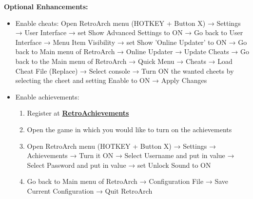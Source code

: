 \begin{enumerate}
\noindent \textbf{Optional Enhancements:}
\begin{itemize}

\item Enable cheats: Open RetroArch menu (HOTKEY + Button X) → Settings → User Interface → set Show Advanced Settings to ON → Go back to User Interface → Menu Item Visibility → set Show 'Online Updater' to ON → Go back to Main menu of RetroArch → Online Updater → Update Cheats → Go back to the Main menu of RetroArch → Quick Menu → Cheats → Load Cheat File (Replace) → Select console → Turn ON the wanted cheets by selecting the cheet and setting Enable to ON → Apply Changes

\item Enable achievements:
\begin{enumerate}
\item Register at \href{https://retroachievements.org}{\textbf{\color{blue}RetroAchievements}}
\item Open the game in which you would like to turn on the achievements
\item Open RetroArch menu (HOTKEY + Button X) → Settings → Achievements → Turn it ON → Select Username and put in value → Select Password and put in value → set Unlock Sound to ON
\item Go back to Main menu of RetroArch → Configuration File → Save Current Configuration → Quit RetroArch
\end{enumerate}

\end{itemize}

\end{enumerate}


